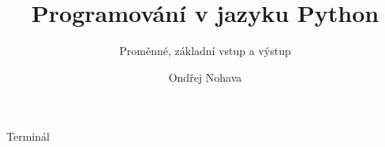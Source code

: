 \documentclass{beamer}
\title{Programování v jazyku Python}
\subtitle{Proměnné, základní vstup a výstup}
\author{Ondřej Nohava}
\institute[DDMJH]{Dům dětí a mládeže Jindřichův Hradec}
\date{}
\begin{document}
\begin{frame}
\titlepage
\end{frame}

\begin{frame}[t]{Terminál}


\end{frame}
\end{document}
